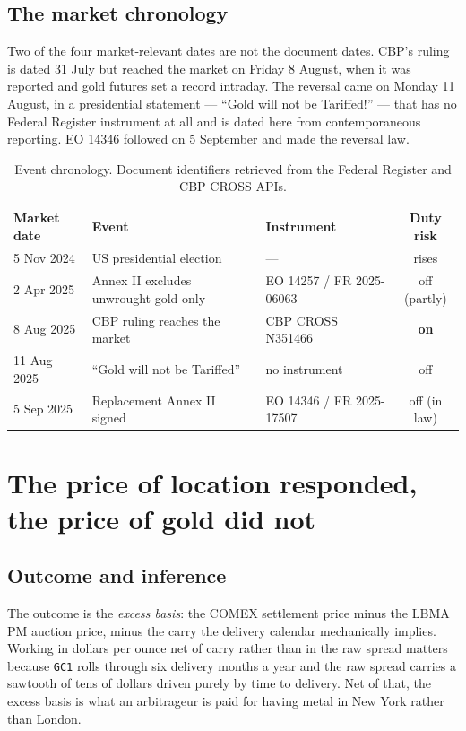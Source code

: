 \documentclass[11pt,a4paper]{article}
\begin{document}
\subsection{The market chronology}

Two of the four market-relevant dates are not the document dates. CBP's ruling is dated 31 July
but reached the market on Friday 8 August, when it was reported and gold futures set a record
intraday. The reversal came on Monday 11 August, in a presidential statement --- ``Gold will not
be Tariffed!'' --- that has no Federal Register instrument at all and is dated here from
contemporaneous reporting. EO 14346 followed on 5 September and made the reversal law.

\begin{table}[h]
\centering
\small
\begin{tabular}{@{}lllc@{}}
\toprule
\textbf{Market date} & \textbf{Event} & \textbf{Instrument} & \textbf{Duty risk} \\
\midrule
5 Nov 2024 & US presidential election & --- & rises \\
2 Apr 2025 & Annex II excludes unwrought gold only & EO 14257 / FR 2025-06063 & off (partly) \\
8 Aug 2025 & CBP ruling reaches the market & CBP CROSS N351466 & \textbf{on} \\
11 Aug 2025 & ``Gold will not be Tariffed'' & no instrument & off \\
5 Sep 2025 & Replacement Annex II signed & EO 14346 / FR 2025-17507 & off (in law) \\
\bottomrule
\end{tabular}
\caption{Event chronology. Document identifiers retrieved from the Federal Register and CBP
CROSS APIs.}
\end{table}

\section{The price of location responded, the price of gold did not}
\label{sec:events}

\subsection{Outcome and inference}

The outcome is the \emph{excess basis}: the COMEX settlement price minus the LBMA PM auction
price, minus the carry the delivery calendar mechanically implies. Working in dollars per ounce
net of carry rather than in the raw spread matters because \texttt{GC1} rolls through six
delivery months a year and the raw spread carries a sawtooth of tens of dollars driven purely by
time to delivery. Net of that, the excess basis is what an arbitrageur is paid for having metal
in New York rather than London.
\end{document}

